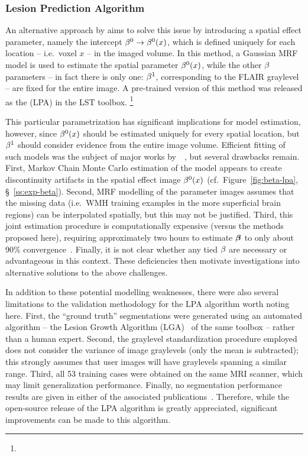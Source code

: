 \subsubsection{Lesion Prediction Algorithm}\label{sss:limits-lpa}
An alternative approach by \citeauthor{Schmidt2017a} aims to solve this issue
by introducing a spatial effect parameter, namely the intercept $\beta^0 \rightarrow \beta^0(x)$,
which is defined uniquely for each location -- i.e.\ voxel $x$ -- in the imaged volume.
In this method, a Gaussian MRF model is used to estimate the spatial parameter $\beta^0(x)$,
while the other $\beta$ parameters
-- in fact there is only one: $\beta^1$, corresponding to the FLAIR graylevel --
are fixed for the entire image.
A pre-trained version of this method was released as
the  (LPA) in the LST toolbox.%
\footnote{}
\par
This particular parametrization has significant implications for model estimation, however,
since $\beta^0(x)$ should be estimated uniquely for every spatial location,
but $\beta^1$ should consider evidence from the entire image volume.
Efficient fitting of such models was the subject of major works
by~\citeauthor{Schmidt2017}~\cite{Schmidt2017a,Schmidt2017}, but several drawbacks remain.
First, Markov Chain Monte Carlo estimation of the model
appears to create discontinuity artifacts in the spatial effect image $\beta^0(x)$
(cf.~Figure~\ref{fig:beta-lpa}, \S~\ref{ss:exp-beta}).
Second, MRF modelling of the parameter images assumes that the missing data
(i.e.\ WMH training examples in the more superficial brain regions)
can be interpolated spatially, but this may not be justified.
Third, this joint estimation procedure is computationally expensive
(versus the methods proposed here),
requiring approximately two hours to estimate $\bm{\beta}$
to only about 90\% convergence~\cite{Schmidt2017a}.
Finally, it is not clear whether any tied $\beta$ are necessary or advantageous in this context.
These deficiencies then motivate investigations into alternative solutions to the above challenges.
\par
In addition to these potential modelling weaknesses, there were also several limitations
to the validation methodology for the LPA algorithm worth noting here.
First, the ``ground truth'' segmentations were generated using an automated algorithm
-- the Lesion Growth Algorithm (LGA)~\cite{Schmidt2012} of the same toolbox --
rather than a human expert.
Second, the graylevel standardization procedure employed does not consider
the variance of image graylevels (only the mean is subtracted);
this strongly assumes that user images will have graylevels spanning a similar range.
Third, all 53 training cases were obtained on the same MRI scanner,
which may limit generalization performance.
Finally, no segmentation performance results
are given in either of the associated publications~\cite{Schmidt2017a,Schmidt2017}.
Therefore, while the open-source release of the LPA algorithm is greatly appreciated,
significant improvements can be made to this algorithm.
